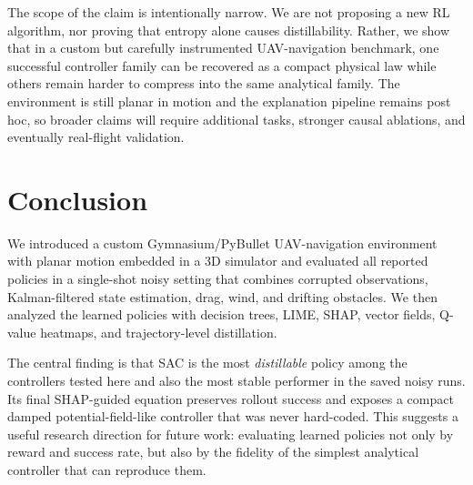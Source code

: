 \documentclass[runningheads]{llncs}
\begin{document}
The scope of the claim is intentionally narrow. We are not proposing a new RL algorithm, nor proving that entropy alone causes distillability. Rather, we show that in a custom but carefully instrumented UAV-navigation benchmark, one successful controller family can be recovered as a compact physical law while others remain harder to compress into the same analytical family. The environment is still planar in motion and the explanation pipeline remains post hoc, so broader claims will require additional tasks, stronger causal ablations, and eventually real-flight validation.

\section{Conclusion}
We introduced a custom Gymnasium/PyBullet UAV-navigation environment with planar motion embedded in a 3D simulator and evaluated all reported policies in a single-shot noisy setting that combines corrupted observations, Kalman-filtered state estimation, drag, wind, and drifting obstacles. We then analyzed the learned policies with decision trees, LIME, SHAP, vector fields, Q-value heatmaps, and trajectory-level distillation.

The central finding is that SAC is the most \emph{distillable} policy among the controllers tested here and also the most stable performer in the saved noisy runs. Its final SHAP-guided equation preserves rollout success and exposes a compact damped potential-field-like controller that was never hard-coded. This suggests a useful research direction for future work: evaluating learned policies not only by reward and success rate, but also by the fidelity of the simplest analytical controller that can reproduce them.

\FloatBarrier


\end{document}
